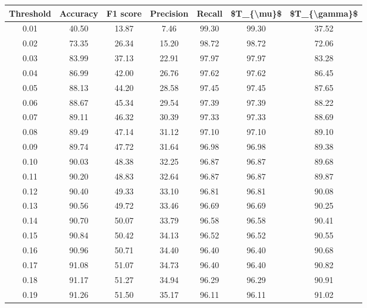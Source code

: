 \begin{tabular}{|c|c|c|c|c|c|c|}
\toprule
 Threshold &  Accuracy &  F1 score &  Precision &  Recall &  \$T\_\{\textbackslash mu\}\$ &  \$T\_\{\textbackslash gamma\}\$ \\
\hline
      0.01 &     40.50 &     13.87 &       7.46 &   99.30 &      99.30 &         37.52 \\
      0.02 &     73.35 &     26.34 &      15.20 &   98.72 &      98.72 &         72.06 \\
      0.03 &     83.99 &     37.13 &      22.91 &   97.97 &      97.97 &         83.28 \\
      0.04 &     86.99 &     42.00 &      26.76 &   97.62 &      97.62 &         86.45 \\
      0.05 &     88.13 &     44.20 &      28.58 &   97.45 &      97.45 &         87.65 \\
      0.06 &     88.67 &     45.34 &      29.54 &   97.39 &      97.39 &         88.22 \\
      0.07 &     89.11 &     46.32 &      30.39 &   97.33 &      97.33 &         88.69 \\
      0.08 &     89.49 &     47.14 &      31.12 &   97.10 &      97.10 &         89.10 \\
      0.09 &     89.74 &     47.72 &      31.64 &   96.98 &      96.98 &         89.38 \\
      0.10 &     90.03 &     48.38 &      32.25 &   96.87 &      96.87 &         89.68 \\
      0.11 &     90.20 &     48.83 &      32.64 &   96.87 &      96.87 &         89.87 \\
      0.12 &     90.40 &     49.33 &      33.10 &   96.81 &      96.81 &         90.08 \\
      0.13 &     90.56 &     49.72 &      33.46 &   96.69 &      96.69 &         90.25 \\
      0.14 &     90.70 &     50.07 &      33.79 &   96.58 &      96.58 &         90.41 \\
      0.15 &     90.84 &     50.42 &      34.13 &   96.52 &      96.52 &         90.55 \\
      0.16 &     90.96 &     50.71 &      34.40 &   96.40 &      96.40 &         90.68 \\
      0.17 &     91.08 &     51.07 &      34.73 &   96.40 &      96.40 &         90.82 \\
      0.18 &     91.17 &     51.27 &      34.94 &   96.29 &      96.29 &         90.91 \\
      0.19 &     91.26 &     51.50 &      35.17 &   96.11 &      96.11 &         91.02 \\

\end{tabular}
